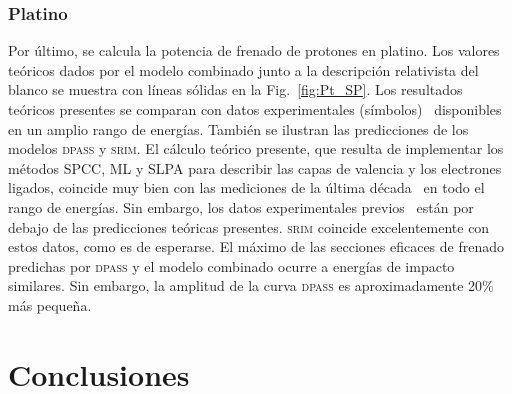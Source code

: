 \subsubsection{Platino}

Por último, se calcula la potencia de frenado de protones en platino. 
Los valores teóricos dados por el modelo combinado junto a la 
descripción relativista del blanco se muestra con líneas sólidas en la 
Fig.~\ref{fig:Pt_SP}. Los resultados teóricos presentes se comparan con 
datos experimentales (símbolos)~\cite{iaea,Primetzhofer:12,Goebl:13,
Celedon:15,Moro:20} disponibles en un amplio rango de energías. También 
se ilustran las predicciones de los modelos \textsc{dpass} y \textsc{srim}. 
El cálculo teórico presente, que resulta de implementar los métodos 
SPCC, ML y SLPA para describir las capas de valencia y los electrones 
ligados, coincide muy bien con las mediciones de la última 
década~\cite{Primetzhofer:12,Goebl:13,Celedon:15,Moro:20} en todo el 
rango de energías. Sin embargo, los datos experimentales 
previos~\cite{iaea,Krist:83,Sirotinin:84,Ishiwari:74,Ishiwari:79,
Ogino:88,Sakamoto:91,Shiomi:94} están por 
debajo de las predicciones teóricas presentes. \textsc{srim} coincide 
excelentemente con estos datos, como es de esperarse. El máximo de las 
secciones eficaces de frenado predichas por \textsc{dpass} y el modelo combinado 
ocurre a energías de impacto similares. Sin embargo, la amplitud de la 
curva \textsc{dpass} es aproximadamente 20\% más pequeña. 

\begin{comment}
\subsection{Ionización de capa $L$}
\label{subsec:results-ionLshell}

En esta sección se examina la ionización de capa $L$ a partir de la 
aproximación de plasma local por capa en dos blancos relativistas: Ta y 
Pt. 
\end{comment}

\section{Conclusiones}
\label{sec:conclu-heavy}

